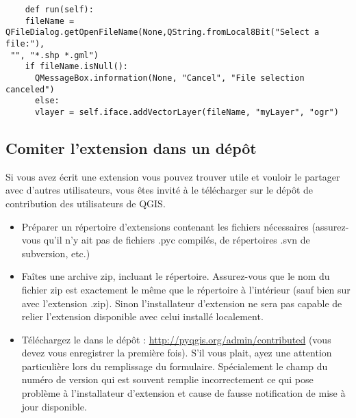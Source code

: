 \begin{verbatim}
    def run(self):
    fileName = QFileDialog.getOpenFileName(None,QString.fromLocal8Bit("Select a file:"),
 "", "*.shp *.gml")
    if fileName.isNull():
      QMessageBox.information(None, "Cancel", "File selection canceled")
      else:
      vlayer = self.iface.addVectorLayer(fileName, "myLayer", "ogr")
\end{verbatim}


\subsection{Comiter l'extension dans un d\'ep\^ot}

Si vous avez \'ecrit une extension vous pouvez trouver utile et vouloir le partager
avec d'autres utilisateurs, vous \^etes invit\'e \`a le t\'el\'echarger sur le d\'ep\^ot de
contribution des utilisateurs de QGIS.
\begin{itemize}
\item Pr\'eparer un r\'epertoire d'extensions contenant les fichiers n\'ecessaires
(assurez-vous qu'il n'y ait pas de fichiers .pyc compil\'es, de r\'epertoires .svn
de subversion, etc.)
\item Fa\^ites une archive zip, incluant le r\'epertoire. Assurez-vous que le nom du
fichier zip est exactement le m\^eme que le r\'epertoire \`a l'int\'erieur (sauf bien
sur avec l'extension .zip). Sinon l'installateur d'extension ne sera pas capable
de relier l'extension disponible avec celui install\'e localement.
\item T\'el\'echargez le dans le d\'ep\^ot : \url{http://pyqgis.org/admin/contributed}
(vous devez vous enregistrer la premi\`ere fois). S'il vous plait, ayez une
attention particuli\`ere lors du remplissage du formulaire. Sp\'ecialement le champ
du num\'ero de version qui est souvent remplie incorrectement ce qui pose
probl\`eme \`a l'installateur d'extension et cause de fausse notification de mise \`a
jour disponible.
\end{itemize}

